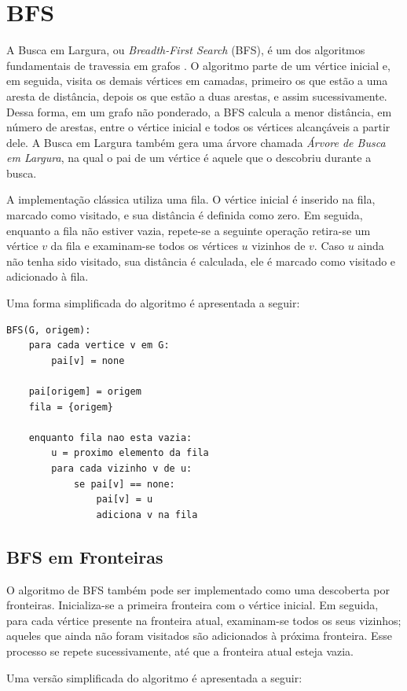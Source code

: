\section{BFS}
A Busca em Largura, ou \textit{Breadth-First Search} (BFS), é um dos algoritmos fundamentais de travessia em grafos \cite{cormenalgorithms}. O algoritmo parte de um vértice inicial e, em seguida, visita os demais vértices em camadas, primeiro os que estão a uma aresta de distância, depois os que estão a duas arestas, e assim sucessivamente. Dessa forma, em um grafo não ponderado, a BFS calcula a menor distância, em número de arestas, entre o vértice inicial e todos os vértices alcançáveis a partir dele. A Busca em Largura também gera uma árvore chamada \textit{Árvore de Busca em Largura}, na qual o pai de um vértice é aquele que o descobriu durante a busca.

A implementação clássica utiliza uma fila. O vértice inicial é inserido na fila, marcado como visitado, e sua distância é definida como zero. Em seguida, enquanto a fila não estiver vazia, repete-se a seguinte operação retira-se um vértice $v$ da fila e examinam-se todos os vértices $u$ vizinhos de $v$. Caso $u$ ainda não tenha sido visitado, sua distância é calculada, ele é marcado como visitado e adicionado à fila.

Uma forma simplificada do algoritmo é apresentada a seguir:

\begin{lstlisting}
BFS(G, origem):
	para cada vertice v em G:
        pai[v] = none

    pai[origem] = origem
    fila = {origem}

    enquanto fila nao esta vazia:
		u = proximo elemento da fila
		para cada vizinho v de u:
			se pai[v] == none:
				pai[v] = u
				adiciona v na fila
\end{lstlisting}

\subsection{BFS em Fronteiras}
O algoritmo de BFS também pode ser implementado como uma descoberta por fronteiras. Inicializa-se a primeira fronteira com o vértice inicial. Em seguida, para cada vértice presente na fronteira atual, examinam-se todos os seus vizinhos; aqueles que ainda não foram visitados são adicionados à próxima fronteira. Esse processo se repete sucessivamente, até que a fronteira atual esteja vazia.

Uma versão simplificada do algoritmo é apresentada a seguir:

